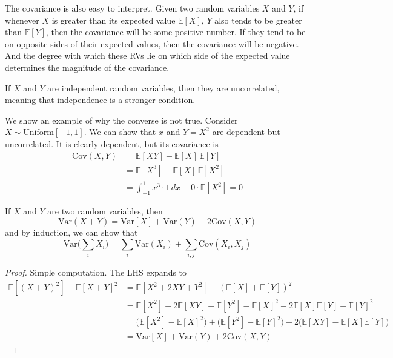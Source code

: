 \documentclass{article}
\begin{document}
    The covariance is also easy to interpret. Given two random variables $X$ and $Y$, if whenever $X$ is greater than its expected value $\mathbb{E}[X]$, $Y$ also tends to be greater than $\mathbb{E}[Y]$, then the covariance will be some positive number. If they tend to be on opposite sides of their expected values, then the covariance will be negative. And the degree with which these RVs lie on which side of the expected value determines the magnitude of the covariance. 

    \begin{theorem}
      If $X$ and $Y$ are independent random variables, then they are uncorrelated, meaning that independence is a stronger condition. 
    \end{theorem}

    We show an example of why the converse is not true. Consider $X \sim \mathrm{Uniform}[-1, 1]$. We can show that $x$ and $Y = X^2$ are dependent but uncorrelated. It is clearly dependent, but its covariance is 
    \begin{align*}
      \mathrm{Cov}(X, Y) & = \mathbb{E}[X Y] - \mathbb{E}[X] \, \mathbb{E}[Y] \\
      & = \mathbb{E}[X^3] - \mathbb{E}[X] \, \mathbb{E}[X^2] \\
      & = \int_{-1}^1 x^3 \cdot 1 \,dx - 0 \cdot \mathbb{E}[X^2] = 0
    \end{align*}

    \begin{theorem}
      If $X$ and $Y$ are two random variables, then 
      \begin{equation}
        \mathrm{Var}(X + Y) = \mathrm{Var}[X] + \mathrm{Var}(Y) + 2 \mathrm{Cov}(X, Y)
      \end{equation}
      and by induction, we can show that 
      \begin{equation}
        \mathrm{Var}\bigg( \sum_i X_i\bigg) = \sum_{i} \mathrm{Var}(X_i) + \sum_{i, j} \mathrm{Cov}(X_i, X_j)
      \end{equation}
    \end{theorem}
    \begin{proof}
      Simple computation. The LHS expands to 
      \begin{align*}
        \mathbb{E}[(X + Y)^2] - \mathbb{E}[X + Y]^2 & = \mathbb{E}[X^2 + 2XY + Y^2] - (\mathbb{E}[X] + \mathbb{E}[Y])^2 \\
        & = \mathbb{E}[X^2] + 2 \mathbb{E}[XY] + \mathbb{E}[Y^2] - \mathbb{E}[X]^2 - 2 \mathbb{E}[X] \mathbb{E}[Y] - \mathbb{E}[Y]^2 \\
        & = \big( \mathbb{E}[X^2] - \mathbb{E}[X]^2 \big) + \big( \mathbb{E}[Y^2] - \mathbb{E}[Y]^2 \big) + 2 \big( \mathbb{E}[XY] - \mathbb{E}[X] \mathbb{E}[Y] \big) \\
        & = \mathrm{Var}[X] + \mathrm{Var}(Y) + 2 \mathrm{Cov}(X, Y) 
      \end{align*}
    \end{proof}
\end{document}
